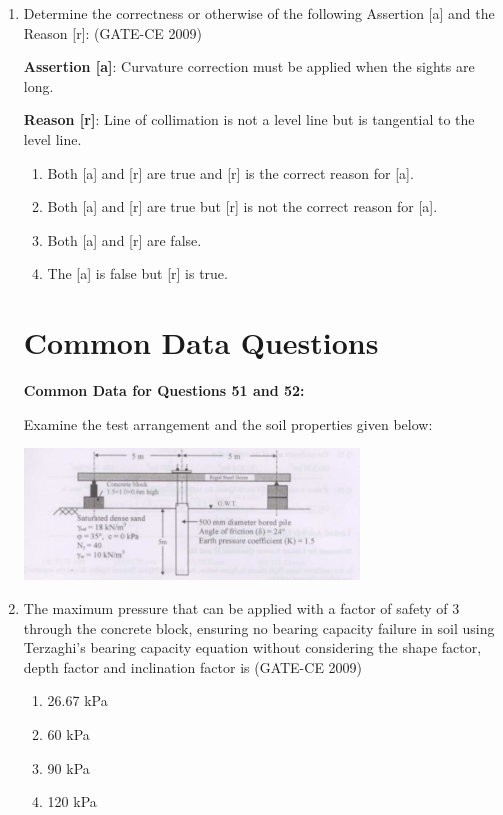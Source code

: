 \documentclass[12pt]{article}
\begin{document}
\begin{enumerate}[label=Q.\arabic*]
    \item Determine the correctness or otherwise of the following Assertion [a] and the Reason [r]: (GATE-CE 2009)

    \textbf{Assertion [a]}: Curvature correction must be applied when the sights are long.

    \textbf{Reason [r]}: Line of collimation is not a level line but is tangential to the level line.
    \begin{enumerate}[label=(\Alph*)]
        \item Both [a] and [r] are true and [r] is the correct reason for [a].
        \item Both [a] and [r] are true but [r] is not the correct reason for [a].
        \item Both [a] and [r] are false.
        \item The [a] is false but [r] is true.
    \end{enumerate}

\section*{Common Data Questions}
\textbf{Common Data for Questions 51 and 52:}

Examine the test arrangement and the soil properties given below:
\begin{center}
\includegraphics[width=0.7\textwidth]{image5.jpg}
\end{center}

    \item The maximum pressure that can be applied with a factor of safety of 3 through the concrete block, ensuring no bearing capacity failure in soil using Terzaghi's bearing capacity equation without considering the shape factor, depth factor and inclination factor is (GATE-CE 2009)
    \begin{enumerate}[label=(\Alph*)]
        \item 26.67 kPa 
        \item 60 kPa 
        \item 90 kPa 
        \item 120 kPa
    \end{enumerate}
    

\end{enumerate}
\end{document}
